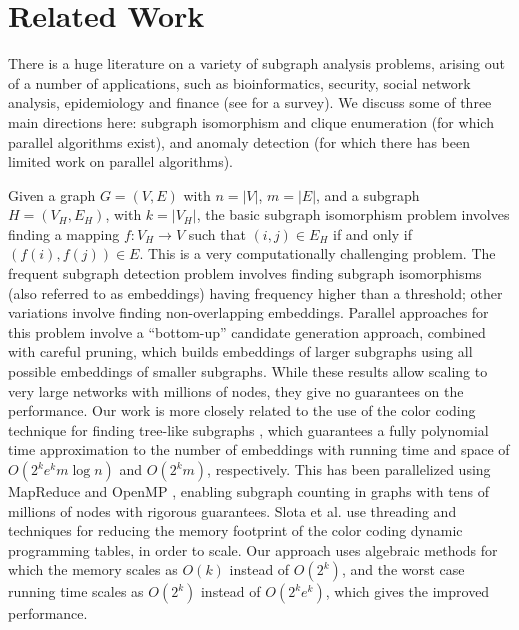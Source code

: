\section{Related Work}
\label{sec:related}

There is a huge literature on a variety of subgraph analysis problems, arising
out of a number of applications, such as bioinformatics, security,
social network analysis, epidemiology and finance (see  \cite{akoglu2014graph} for a survey).
We discuss some of three main directions here: 
subgraph isomorphism and clique
enumeration (for which parallel algorithms exist), and anomaly detection (for which
there has been limited work on parallel algorithms).

Given a graph $G=(V, E)$ with $n=|V|$, $m=|E|$, and a subgraph $H=(V_H, E_H)$, with $k=|V_H|$,
the basic subgraph isomorphism problem involves finding a mapping $f:V_H\rightarrow V$
such that $(i, j)\in E_H$ if and only if $(f(i), f(j))\in E$. This is
a very computationally challenging problem. The frequent subgraph detection
problem involves finding subgraph isomorphisms (also referred to as embeddings) 
having frequency higher than a threshold; other variations involve finding
non-overlapping embeddings.
Parallel approaches for this problem involve a ``bottom-up'' candidate generation approach,
combined with careful pruning, which builds embeddings of larger subgraphs using all possible
embeddings of smaller subgraphs\cite{hamid2016scalemine, elsidy:vldb14}. While these results
allow scaling to very large networks with millions of nodes, they give no guarantees on
the performance. Our work is more closely related to the use of the color coding technique
for finding tree-like subgraphs \cite{alon2008biomolecular, huffner2008algorithm}, which
guarantees a fully polynomial time approximation to the number of embeddings with
running time and space of $O(2^ke^km\log{n})$ and $O(2^km)$, respectively.
This has been parallelized using MapReduce \cite{zhao2012sahad} and 
OpenMP \cite{slota:icpp13, slota:ipdps14}, enabling subgraph counting in graphs with
tens of millions of nodes with rigorous guarantees. Slota et al. \cite{slota:icpp13, slota:ipdps14}
use threading and techniques for reducing the memory footprint of the color coding
dynamic programming tables, in order to scale. Our approach uses algebraic methods
for which the memory scales as $O(k)$ instead of $O(2^k)$, and the worst case
running time scales as $O(2^k)$ instead of $O(2^ke^k)$, which gives the improved performance.

